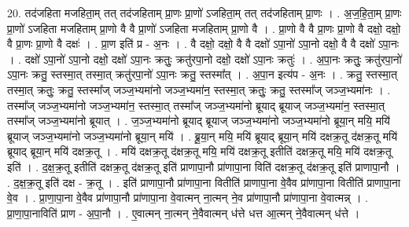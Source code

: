 \documentclass[17pt]{extarticle}
\begin{document}
20. तद॑जहिता मजहिता॒म् तत् तद॑जहिताम् प्रा॒णः प्रा॒णो॑ ऽजहिता॒म् तत् तद॑जहिताम् प्रा॒णः । . अ॒ज॒हि॒ता॒म् प्रा॒णः प्रा॒णो॑ ऽजहिता मजहिताम् प्रा॒णो वै वै प्रा॒णो॑ ऽजहिता मजहिताम् प्रा॒णो वै । . प्रा॒णो वै वै प्रा॒णः प्रा॒णो वै दक्षो॒ दक्षो॒ वै प्रा॒णः प्रा॒णो वै दक्षः॑ । . प्रा॒ण इति॑ प्र - अ॒नः । . वै दक्षो॒ दक्षो॒ वै वै दक्षो॑ ऽपा॒नो॑ ऽपा॒नो दक्षो॒ वै वै दक्षो॑ ऽपा॒नः । . दक्षो॑ ऽपा॒नो॑ ऽपा॒नो दक्षो॒ दक्षो॑ ऽपा॒नः क्रतुः॒ क्रतु॑रपा॒नो दक्षो॒ दक्षो॑ ऽपा॒नः क्रतुः॑ । . अ॒पा॒नः क्रतुः॒ क्रतु॑रपा॒नो॑ ऽपा॒नः क्रतु॒ स्तस्मा॒त् तस्मा॒त् क्रतु॑रपा॒नो॑ ऽपा॒नः क्रतु॒ स्तस्मा᳚त् । . अ॒पा॒न इत्य॑प - अ॒नः । . क्रतु॒ स्तस्मा॒त् तस्मा॒त् क्रतुः॒ क्रतु॒ स्तस्मा᳚ज् जञ्ज॒भ्यमा॑नो जञ्ज॒भ्यमा॑न॒ स्तस्मा॒त् क्रतुः॒ क्रतु॒ स्तस्मा᳚ज् जञ्ज॒भ्यमा॑नः । . तस्मा᳚ज् जञ्ज॒भ्यमा॑नो जञ्ज॒भ्यमा॑न॒ स्तस्मा॒त् तस्मा᳚ज् जञ्ज॒भ्यमा॑नो ब्रूयाद् ब्रूयाज् जञ्ज॒भ्यमा॑न॒ स्तस्मा॒त् तस्मा᳚ज् जञ्ज॒भ्यमा॑नो ब्रूयात् । . ज॒ञ्ज॒भ्यमा॑नो ब्रूयाद् ब्रूयाज् जञ्ज॒भ्यमा॑नो जञ्ज॒भ्यमा॑नो ब्रूया॒न् मयि॒ मयि॑ ब्रूयाज् जञ्ज॒भ्यमा॑नो जञ्ज॒भ्यमा॑नो ब्रूया॒न् मयि॑ । . ब्रू॒या॒न् मयि॒ मयि॑ ब्रूयाद् ब्रूया॒न् मयि॑ दक्षक्र॒तू द॑क्षक्र॒तू मयि॑ ब्रूयाद् ब्रूया॒न् मयि॑ दक्षक्र॒तू । . मयि॑ दक्षक्र॒तू द॑क्षक्र॒तू मयि॒ मयि॑ दक्षक्र॒तू इतीति॑ दक्षक्र॒तू मयि॒ मयि॑ दक्षक्र॒तू इति॑ । . द॒क्ष॒क्र॒तू इतीति॑ दक्षक्र॒तू द॑क्षक्र॒तू इति॑ प्राणापा॒नौ प्रा॑णापा॒ना विति॑ दक्षक्र॒तू द॑क्षक्र॒तू इति॑ प्राणापा॒नौ । . द॒क्ष॒क्र॒तू इति॑ दक्ष - क्र॒तू । . इति॑ प्राणापा॒नौ प्रा॑णापा॒ना वितीति॑ प्राणापा॒ना वे॒वैव प्रा॑णापा॒ना वितीति॑ प्राणापा॒ना वे॒व । . प्रा॒णा॒पा॒ना वे॒वैव प्रा॑णापा॒नौ प्रा॑णापा॒ना वे॒वात्मन् ना॒त्मन् ने॒व प्रा॑णापा॒नौ प्रा॑णापा॒ना वे॒वात्मन्न् । . प्रा॒णा॒पा॒नाविति॑ प्राण - अ॒पा॒नौ । . ए॒वात्मन् ना॒त्मन् ने॒वैवात्मन् ध॑त्ते धत्त आ॒त्मन् ने॒वैवात्मन् ध॑त्ते । \newline
\end{document}
